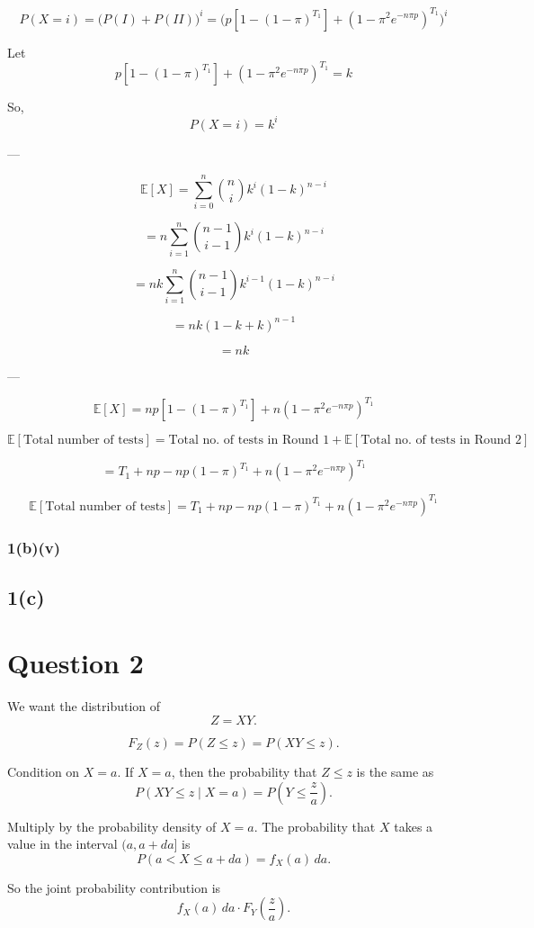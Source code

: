 \documentclass[12pt]{article}
\begin{document}
\[
P(X = i) = \big(P(I) + P(II)\big)^i
= \Big( p[1-(1-\pi)^{T_1}] + (1-\pi^2 e^{-n\pi p})^{T_1} \Big)^i
\]

Let
\[
p[1-(1-\pi)^{T_1}] + (1-\pi^2 e^{-n\pi p})^{T_1} = k
\]

So,
\[
P(X=i) = k^i
\]

---

\[
\mathbb{E}[X] = \sum_{i=0}^n \binom{n}{i} k^i (1-k)^{n-i}
\]

\[
= n \sum_{i=1}^n \binom{n-1}{i-1} k^i (1-k)^{n-i}
\]

\[
= nk \sum_{i=1}^n \binom{n-1}{i-1} k^{i-1} (1-k)^{n-i}
\]

\[
= nk (1-k+k)^{n-1}
\]

\[
= nk
\]

---

\[
\mathbb{E}[X] = np[1-(1-\pi)^{T_1}] + n(1-\pi^2 e^{-n\pi p})^{T_1}
\]

\[
\mathbb{E}[\text{Total number of tests}] 
= \text{Total no. of tests in Round 1} + \mathbb{E}[\text{Total no. of tests in Round 2}]
\]

\[
= T_1 + np - np(1-\pi)^{T_1} + n(1-\pi^2 e^{-n\pi p})^{T_1}
\]

\[
\boxed{
\mathbb{E}[\text{Total number of tests}]
= T_1 + np - np(1-\pi)^{T_1} + n(1-\pi^2 e^{-n\pi p})^{T_1}
}
\]
\subsubsection{1(b)(v)}

\subsection{1(c)}
\section{Question 2}


We want the distribution of
\[
Z = XY.
\]


\[
F_Z(z) = P(Z \leq z) = P(XY \leq z).
\]


Condition on $X = a$.  
If $X = a$, then the probability that $Z \leq z$ is the same as
\[
P(XY \leq z \mid X=a) = P\!\left(Y \leq \frac{z}{a}\right).
\]


Multiply by the probability density of $X=a$. 
The probability that $X$ takes a value in the interval $(a, a+da]$ is
\[
P(a < X \leq a+da) = f_X(a)\, da.
\]

So the joint probability contribution is
\[
f_X(a)\, da \cdot F_Y\!\left(\frac{z}{a}\right).
\]
\end{document}

